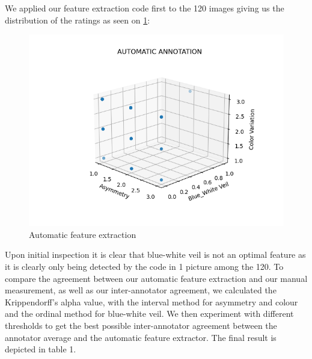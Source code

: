 We applied our feature extraction code first to the 120 images giving us the distribution of the ratings as seen on \ref{fig:Automatic feature extraction}:

\begin{figure}[H]
    \centering
    \includegraphics[width=1\linewidth]{annotation_automatic.png}
    \caption{Automatic feature extraction}
    \label{fig:Automatic feature extraction}
\end{figure}

\noindent Upon initial inspection it is clear that blue-white veil is not an optimal feature as it is clearly only being detected by the code in 1 picture among the 120.
\newline
To compare the agreement between our automatic feature extraction and our manual measurement, as well as our inter-annotator agreement, we calculated the Krippendorff's alpha value, with the interval method for asymmetry and colour and the ordinal method for blue-white veil.
\newline
We then experiment with different thresholds to get the best possible inter-annotator agreement between the annotator average and the automatic feature extractor. The final result is depicted in table 1. 

